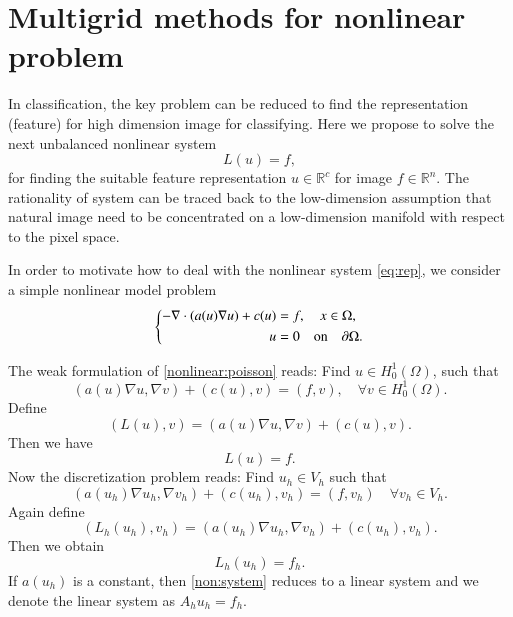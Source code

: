 \section{Multigrid methods for nonlinear problem}
In classification, the key problem can be reduced to find the 
representation (feature) for high dimension image for classifying. 
Here we propose to solve the next unbalanced nonlinear system  
\begin{equation}\label{eq:rep}
L(u) = f,
\end{equation}
for finding the suitable feature representation $u \in \mathbb{R}^c$ for  
image $f\in \mathbb{R}^{n}$. The rationality of system can be traced back to 
the low-dimension assumption that natural image need to be concentrated 
on a low-dimension manifold with respect to the pixel space.

In order to motivate how to deal with the nonlinear system \eqref{eq:rep}, we 
consider a simple nonlinear model problem 
\begin{equation}\label{nonlinear:poisson}
\left\{
\begin{aligned}
-\nabla\cdot(a(u)\nabla u)+c(u)&=f, \quad x\in \Omega,\\
u&=0\quad\hbox{on}\quad\partial \Omega.
\end{aligned}
\right. 
\end{equation}

The weak formulation of \eqref{nonlinear:poisson} reads: Find $u\in H^1_0(\Omega)$, such that 
$$
(a(u)\nabla u,\nabla v)+(c(u), v)=(f,v), \quad \forall v\in H^1_0(\Omega). 
$$
Define
\begin{equation}
(L(u), v)=(a(u)\nabla u,\nabla v)+(c(u), v).
\end{equation}
Then we have 
\begin{equation}
L(u)=f.
\end{equation}
Now the discretization problem reads: Find $u_h\in V_h$ such that
\begin{equation}
(a(u_h)\nabla u_h,\nabla v_h)+(c(u_h), v_h)=(f,v_h)\quad \forall v_h\in V_h. 
\end{equation}
Again define 
$$
(L_h(u_h), v_h)=(a(u_h)\nabla u_h,\nabla v_h)+(c(u_h), v_h).
$$
Then we obtain 
\begin{equation}\label{non:system}
L_h(u_h)=f_h. 
\end{equation}
If $a(u_h)$ is a constant, then \eqref{non:system} reduces to a linear system and we denote the 
linear system as $A_hu_h=f_h$. 

